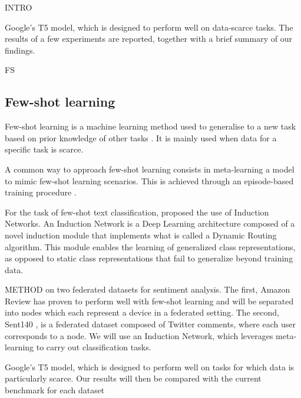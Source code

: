 INTRO

Google's T5 model, which is designed to perform well on data-scarce tasks. The results of a few experiments are reported, together with a brief summary of our findings.


FS
\subsection{Few-shot learning}
            Few-shot learning is a machine learning method used to generalise to a new task based on prior knowledge of other tasks \cite{wang2020generalizing}. It is mainly used when data for a specific task is scarce.
            
            A common way to approach few-shot learning consists in meta-learning a model to mimic few-shot learning scenarios. This is achieved through an episode-based training procedure \cite{NIPS2016_90e13578}. 
            
            For the task of few-shot text classification, \cite{geng2019induction} proposed the use of Induction Networks. An Induction Network is a Deep Learning architecture composed of a novel induction module that implements what is called a Dynamic Routing algorithm. This module enables the learning of generalized class representations, as opposed to static class representations that fail to generalize beyond training data.
            



METHOD
on two federated datasets for sentiment analysis. The first, Amazon Review \cite{yu2018diverse} has proven to perform well with few-shot learning and will be separated into nodes which each represent a device in a federated setting. The second, Sent140 \cite{caldas2019leaf}, is a federated dataset composed of Twitter comments, where each user corresponds to a node. We will use an Induction Network, which leverages meta-learning to carry out classification tasks.

Google's T5 model, which is designed to perform well on tasks for which data is particularly scarce. Our results will then be compared with the current benchmark for each dataset \textcolor{green}{\textbf{\cite{Bench1}}} \textcolor{green}{\textbf{\cite{Bench2}}}




